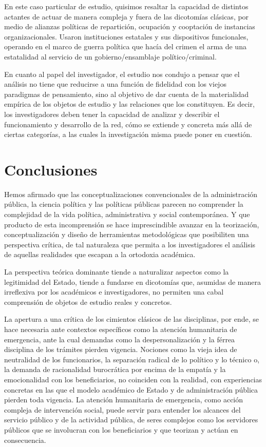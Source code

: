 \documentclass[
  spanish,
  11pt,
  a4paper,
]{scrbook}
\begin{document}
En este caso particular de estudio, quisimos resaltar la capacidad de
distintos actantes de actuar de manera compleja y fuera de las
dicotomías clásicas, por medio de alianzas políticas de repartición,
ocupación y cooptación de instancias organizacionales. Usaron
instituciones estatales y sus dispositivos funcionales, operando en el
marco de guerra política que hacía del crimen el arma de una estatalidad
al servicio de un gobierno/ensamblaje político/criminal.

En cuanto al papel del investigador, el estudio nos condujo a pensar que
el análisis no tiene que reducirse a una función de fidelidad con los
viejos paradigmas de pensamiento, sino al objetivo de dar cuenta de la
materialidad empírica de los objetos de estudio y las relaciones que los
constituyen. Es decir, los investigadores deben tener la capacidad de
analizar y describir el funcionamiento y desarrollo de la red, cómo se
extiende y concreta más allá de ciertas categorías, a las cuales la
investigación misma puede poner en cuestión.

\section*{Conclusiones}\label{conclusiones-1}


Hemos afirmado que las conceptualizaciones convencionales de la
administración pública, la ciencia política y las políticas públicas
parecen no comprender la complejidad de la vida política, administrativa
y social contemporánea. Y que producto de esta incomprensión se hace
imprescindible avanzar en la teorización, conceptualización y diseño de
herramientas metodológicas que posibiliten una perspectiva crítica, de
tal naturaleza que permita a los investigadores el análisis de aquellas
realidades que escapan a la ortodoxia académica.

La perspectiva teórica dominante tiende a naturalizar aspectos como la
legitimidad del Estado, tiende a fundarse en dicotomías que, asumidas de
manera irreflexiva por los académicos e investigadores, no permiten una
cabal comprensión de objetos de estudio reales y concretos.

La apertura a una crítica de los cimientos clásicos de las disciplinas,
por ende, se hace necesaria ante contextos específicos como la atención
humanitaria de emergencia, ante la cual demandas como la
despersonalización y la férrea disciplina de los trámites pierden
vigencia. Nociones como la vieja idea de neutralidad de los
funcionarios, la separación radical de lo político y lo técnico o, la
demanda de racionalidad burocrática por encima de la empatía y la
emocionalidad con los beneficiarios, no coinciden con la realidad, con
experiencias concretas en las que el modelo académico de Estado y de
administración pública pierden toda vigencia. La atención humanitaria de
emergencia, como acción compleja de intervención social, puede servir
para entender los alcances del servicio público y de la actividad
pública, de seres complejos como los servidores públicos que se
involucran con los beneficiarios y que teorizan y actúan en
consecuencia.
\end{document}
